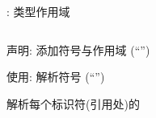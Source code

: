 


\begin{frame}{}
  \begin{center}
  \end{center}
\end{frame}

\begin{frame}{}
  \begin{center}
    : 类型作用域
  \end{center}
  \begin{columns}
  \end{columns}
  \begin{center}
  \end{center}
\end{frame}

\begin{frame}{}
  \begin{center}
    声明: 添加符号与作用域 (``'')

    \vspace{1.00cm}
    使用: 解析符号 (``'')

    \vspace{1.50cm}
  \end{center}
\end{frame}

\begin{frame}{}
  \begin{center}

    \pause
    \vspace{0.80cm}
     解析每个标识符(引用处)的

    \vspace{0.80cm}
  \end{center}
\end{frame}

